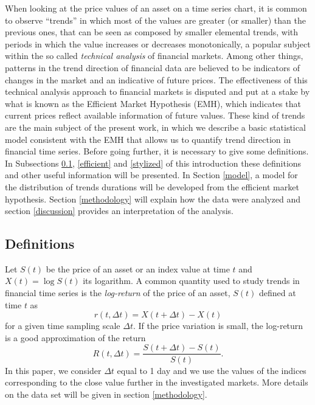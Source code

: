 \documentclass[a4paper]{jpconf}
\begin{document}
When looking at the price values of an asset on a time series chart, it is common to observe ``trends'' in which most of the values are greater (or smaller) than the previous ones, that can be seen as composed by smaller elemental trends, with periods in which the value increases or decreases monotonically, a popular subject within the so called \emph{technical analysis} of financial markets. Among other things, patterns in the trend direction of financial data are believed to be indicators of changes in the market and an indicative of future prices. The effectiveness of this technical analysis approach to financial markets is disputed and put at a stake by what is known as the Efficient Market Hypothesis (EMH), which indicates that current prices reflect available information of future values. These kind of trends are the main subject of the present work, in which we describe a basic statistical model consistent with the EMH that allows us to quantify trend direction in financial time series. Before going further, it is necessary to give some definitions. In Subsections \ref{def}, \ref{efficient} and \ref{stylized} of this introduction these definitions and other useful information will be presented. In Section \ref{model}, a model for the distribution of trends durations will be developed from the efficient market hypothesis. Section \ref{methodology} will explain how the data were analyzed and section \ref{discussion} provides an interpretation of the analysis.
\subsection{Definitions} 
\label{def}
Let $S(t)$ be the price of an asset or an index value at time $t$ and $X(t) = \log{S(t)}$ its logarithm. A common quantity used to study trends in financial time series is the \emph{log-return} of the price of an asset, $S(t)$ defined at time $t$ as
\begin{equation}
r(t,\Delta{t}) = X(t + \Delta{t}) - X(t)
\end{equation}
for a given time sampling scale $\Delta{t}$. If the price variation is small, the log-return is a good approximation of the return
\begin{equation}
R(t,\Delta t) = \frac{S(t+\Delta t) - S(t)}{S(t)}.
\end{equation}
In this paper, we consider $\Delta t$ equal to 1 day and we use the values of the indices corresponding to the close value further in the investigated markets. More details on the data set will be given in section \ref{methodology}.
\end{document}
